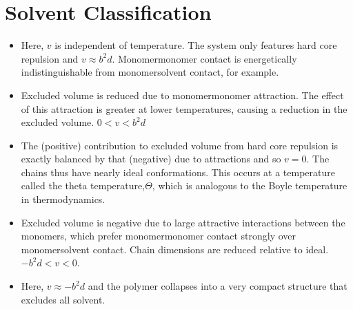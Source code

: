 \documentclass[letterpaper,10pt,english]{sphinxmanual}
\begin{document}
\section{Solvent Classification}
\label{\detokenize{notebooks/L22/1_real_polymers:Solvent-Classification}}\begin{itemize}
\item {} 
\sphinxAtStartPar
{} Here, \(v\) is independent of temperature. The system only features hard core repulsion and \(v ≈ b^2d\). Monomer\sphinxhyphen{}monomer contact is energetically indistinguishable from monomer\sphinxhyphen{}solvent contact, for example.

\item {} 
\sphinxAtStartPar
{} Excluded volume is reduced due to monomer\sphinxhyphen{}monomer attraction. The effect of this attraction is greater at lower temperatures, causing a reduction in the excluded volume. \(0 < v < b^2d\)

\item {} 
\sphinxAtStartPar
{} The (positive) contribution to excluded volume from hard core repulsion is exactly balanced by that (negative) due to attractions and so \(v = 0\). The chains thus have nearly ideal conformations. This occurs at a temperature called the theta temperature,\(Θ\), which is analogous to the Boyle temperature in thermodynamics.

\item {} 
\sphinxAtStartPar
{} Excluded volume is negative due to large attractive interactions between the monomers, which prefer monomer\sphinxhyphen{}monomer contact strongly over monomer\sphinxhyphen{}solvent contact. Chain dimensions are reduced relative to ideal. \(−b^2d < v < 0\).

\item {} 
\sphinxAtStartPar
{} Here, \(v ≈ −b^2d\) and the polymer collapses into a very compact structure that excludes all solvent.

\end{itemize}
\end{document}
